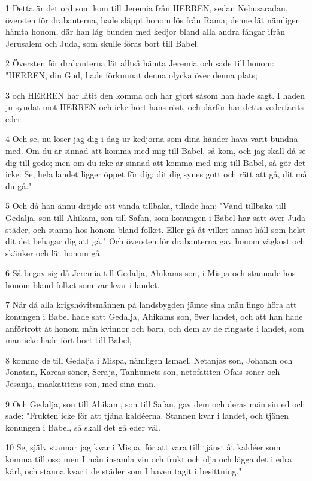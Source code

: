 \par 1 Detta är det ord som kom till Jeremia från HERREN, sedan Nebusaradan, översten för drabanterna, hade släppt honom lös från Rama; denne lät nämligen hämta honom, där han låg bunden med kedjor bland alla andra fångar ifrån Jerusalem och Juda, som skulle föras bort till Babel.
\par 2 Översten för drabanterna lät alltså hämta Jeremia och sade till honom: "HERREN, din Gud, hade förkunnat denna olycka över denna plats;
\par 3 och HERREN har låtit den komma och har gjort såsom han hade sagt. I haden ju syndat mot HERREN och icke hört hans röst, och därför har detta vederfarits eder.
\par 4 Och se, nu löser jag dig i dag ur kedjorna som dina händer hava varit bundna med. Om du är sinnad att komma med mig till Babel, så kom, och jag skall då se dig till godo; men om du icke är sinnad att komma med mig till Babel, så gör det icke. Se, hela landet ligger öppet för dig; dit dig synes gott och rätt att gå, dit må du gå."
\par 5 Och då han ännu dröjde att vända tillbaka, tillade han: "Vänd tillbaka till Gedalja, son till Ahikam, son till Safan, som konungen i Babel har satt över Juda städer, och stanna hos honom bland folket. Eller gå åt vilket annat håll som helst dit det behagar dig att gå." Och översten för drabanterna gav honom vägkost och skänker och lät honom gå.
\par 6 Så begav sig då Jeremia till Gedalja, Ahikams son, i Mispa och stannade hos honom bland folket som var kvar i landet.
\par 7 När då alla krigshövitsmännen på landsbygden jämte sina män fingo höra att konungen i Babel hade satt Gedalja, Ahikams son, över landet, och att han hade anförtrott åt honom män kvinnor och barn, och dem av de ringaste i landet, som man icke hade fört bort till Babel,
\par 8 kommo de till Gedalja i Mispa, nämligen Ismael, Netanjas son, Johanan och Jonatan, Kareas söner, Seraja, Tanhumets son, netofatiten Ofais söner och Jesanja, maakatitens son, med sina män.
\par 9 Och Gedalja, son till Ahikam, son till Safan, gav dem och deras män sin ed och sade: "Frukten icke för att tjäna kaldéerna. Stannen kvar i landet, och tjänen konungen i Babel, så skall det gå eder väl.
\par 10 Se, själv stannar jag kvar i Mispa, för att vara till tjänst åt kaldéer som komma till oss; men I mån insamla vin och frukt och olja och lägga det i edra kärl, och stanna kvar i de städer som I haven tagit i besittning."
